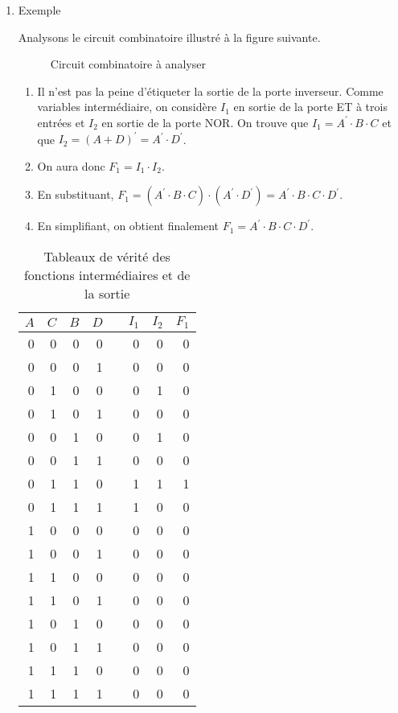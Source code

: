 \documentclass[letter, oneside]{book}
\begin{document}
\begin{enumerate}
\item Exemple
\label{sec:orgba0067c}

Analysons le circuit combinatoire illustré à la figure
suivante.

\begin{figure}[htbp]
\centering

\caption{\label{fig:orgd79d03f}Circuit combinatoire à analyser}
\end{figure}

\begin{enumerate}
\item Il n'est pas la peine d'étiqueter la sortie de la porte
inverseur. Comme variables intermédiaire, on considère \(I_1\) en
sortie de la porte ET à trois entrées et \(I_2\) en sortie de la
porte NOR. On trouve que \(I_1 = A^\prime \cdot B \cdot C\) et que
\(I_2 = (A + D)^\prime = A^\prime \cdot D^\prime\).

\item On aura donc \(F_1 = I_1 \cdot I_2\).

\item En substituant, \(F_1 = ( A^\prime \cdot B \cdot C ) \cdot (
   A^\prime \cdot D^\prime) = A^\prime \cdot B \cdot C \cdot
   D^\prime\).

\item En simplifiant, on obtient finalement \(F_1 = A^\prime \cdot B
   \cdot C \cdot D^\prime\).
\end{enumerate}

\begin{table}[htbp]
\caption{\label{tab:orgd033be4}Tableaux de vérité des fonctions intermédiaires et de la sortie}
\centering
\begin{tabular}{rrrrlrrr}
\(A\) & \(C\) & \(B\) & \(D\) &  & \(I_1\) & \(I_2\) & \(F_1\)\\[0pt]
\hline
0 & 0 & 0 & 0 &  & 0 & 0 & 0\\[0pt]
0 & 0 & 0 & 1 &  & 0 & 0 & 0\\[0pt]
0 & 1 & 0 & 0 &  & 0 & 1 & 0\\[0pt]
0 & 1 & 0 & 1 &  & 0 & 0 & 0\\[0pt]
0 & 0 & 1 & 0 &  & 0 & 1 & 0\\[0pt]
0 & 0 & 1 & 1 &  & 0 & 0 & 0\\[0pt]
0 & 1 & 1 & 0 &  & 1 & 1 & 1\\[0pt]
0 & 1 & 1 & 1 &  & 1 & 0 & 0\\[0pt]
1 & 0 & 0 & 0 &  & 0 & 0 & 0\\[0pt]
1 & 0 & 0 & 1 &  & 0 & 0 & 0\\[0pt]
1 & 1 & 0 & 0 &  & 0 & 0 & 0\\[0pt]
1 & 1 & 0 & 1 &  & 0 & 0 & 0\\[0pt]
1 & 0 & 1 & 0 &  & 0 & 0 & 0\\[0pt]
1 & 0 & 1 & 1 &  & 0 & 0 & 0\\[0pt]
1 & 1 & 1 & 0 &  & 0 & 0 & 0\\[0pt]
1 & 1 & 1 & 1 &  & 0 & 0 & 0\\[0pt]
\end{tabular}
\end{table}
\end{enumerate}
\end{document}
